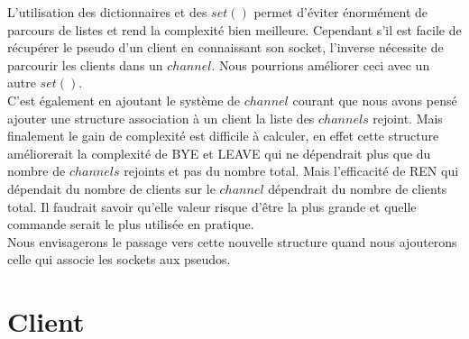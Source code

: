 \documentclass[12pt]{article}
\begin{document}
L'utilisation des dictionnaires et des $set()$ permet d'éviter énormément de parcours
de listes et rend la complexité bien meilleure. Cependant s'il est facile de récupérer le
pseudo d'un client en connaissant son socket, l'inverse nécessite de parcourir les clients
dans un $channel$. Nous pourrions améliorer ceci avec un autre $set()$.
\\C'est également en ajoutant le système de $channel$ courant que nous avons pensé ajouter
une structure association à un client la liste des $channels$ rejoint. Mais finalement le
gain de complexité est difficile à calculer, en effet cette structure améliorerait la complexité
de BYE et LEAVE qui ne dépendrait plus que du nombre de $channels$ rejoints et pas du nombre total.
Mais l'efficacité de REN qui dépendait du nombre de clients sur le $channel$ dépendrait du nombre de clients
total. Il faudrait savoir qu'elle valeur risque d'être la plus grande et quelle commande serait
le plus utilisée en pratique.
\\Nous envisagerons le passage vers cette nouvelle structure quand nous ajouterons celle qui
associe les sockets aux pseudos.
\\


\section{Client}
\end{document}
